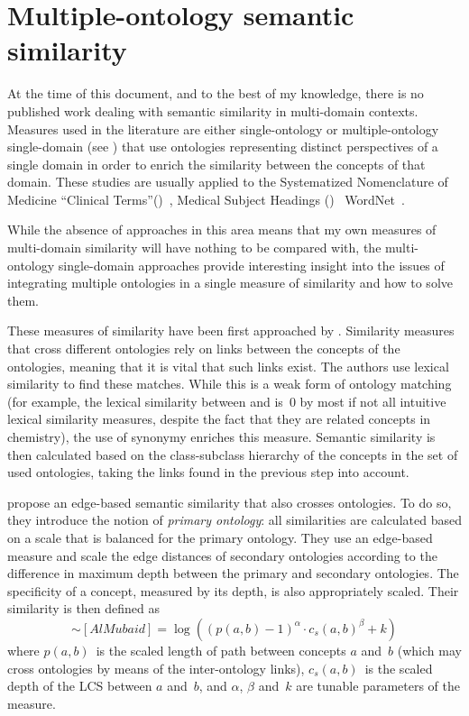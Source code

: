 \section{Multiple-ontology semantic similarity} \label{sec:sota/multi-ontology}

At the time of this document, and to the best of my knowledge, there is no published work dealing with semantic similarity in multi-domain contexts. Measures used in the literature are either single-ontology or multiple-ontology single-domain (see ) that use ontologies representing distinct perspectives of a single domain in order to enrich the similarity between the concepts of that domain. These studies are usually applied to the Systematized Nomenclature of Medicine ``Clinical Terms''()~\citep{Cote1980}, Medical Subject Headings ()~\citep{Rogers1963} \andor WordNet~\citep{Miller1995}.

While the absence of approaches in this area means that my own measures of multi-domain similarity will have nothing to be compared with, the multi-ontology single-domain approaches provide interesting insight into the issues of integrating multiple ontologies in a single measure of similarity and how to solve them.

These measures of similarity have been first approached by \citet{Rodriguez2003}. Similarity measures that cross different ontologies rely on links between the concepts of the ontologies, meaning that it is vital that such links exist. The authors use lexical similarity to find these matches. While this is a weak form of ontology matching (for example, the lexical similarity between  and  is~$0$ by most \mdash if not all \mdash intuitive lexical similarity measures, despite the fact that they are related concepts in chemistry), the use of synonymy enriches this measure. Semantic similarity is then calculated based on the class-subclass hierarchy of the concepts in the set of used ontologies, taking the links found in the previous step into account.

\citet{Al-Mubaid2009} propose an edge-based semantic similarity that also crosses ontologies. To do so, they introduce the notion of \emph{primary ontology}: all similarities are calculated based on a scale that is balanced for the primary ontology. They use an edge-based measure and scale the edge distances of secondary ontologies according to the difference in maximum depth between the primary and secondary ontologies. The specificity of a concept, measured by its depth, is also appropriately scaled. Their similarity is then defined as
\begin{equation}
    \sim[AlMubaid] = \log \left(
        \left(p(a,b)-1\right)^\alpha\cdot c_s(a,b)^\beta + k
    \right)
    \label{eq:almubaid}
\end{equation}
where $p(a,b)$~is the scaled length of path between concepts $a$ and~$b$ (which may cross ontologies by means of the inter-ontology links), $c_s(a,b)$~is the scaled depth of the LCS between $a$ and~$b$, and $\alpha$, $\beta$ and~$k$ are tunable parameters of the measure.

